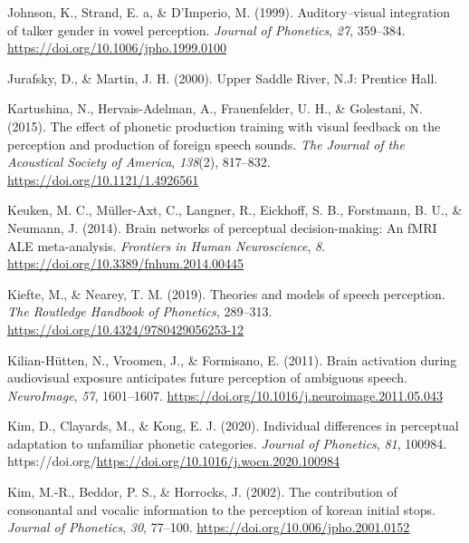 \documentclass[
  11pt,
  english,
  man,floatsintext]{apa6}
\newlength{\cslhangindent}
\newlength{\cslentryspacingunit} %
\newenvironment{CSLReferences}[2] %
 {%
  \setlength{\parindent}{0pt}
  \ifodd #1
  \let\oldpar\par
  \def\par{\hangindent=\cslhangindent\oldpar}
  \fi
  \setlength{\parskip}{#2\cslentryspacingunit}
 }%
 {}
\begin{document}
\begin{CSLReferences}{1}{0}
\leavevmode{}%
Johnson, K., Strand, E. a, \& D'Imperio, M. (1999). Auditory--visual integration of talker gender in vowel perception. \emph{Journal of Phonetics}, \emph{27}, 359--384. \url{https://doi.org/10.1006/jpho.1999.0100}

\leavevmode{}%
Jurafsky, D., \& Martin, J. H. (2000). Upper Saddle River, N.J: Prentice Hall.

\leavevmode{}%
Kartushina, N., Hervais-Adelman, A., Frauenfelder, U. H., \& Golestani, N. (2015). The effect of phonetic production training with visual feedback on the perception and production of foreign speech sounds. \emph{The Journal of the Acoustical Society of America}, \emph{138}(2), 817--832. \url{https://doi.org/10.1121/1.4926561}

\leavevmode{}%
Keuken, M. C., Müller-Axt, C., Langner, R., Eickhoff, S. B., Forstmann, B. U., \& Neumann, J. (2014). Brain networks of perceptual decision-making: An fMRI ALE meta-analysis. \emph{Frontiers in Human Neuroscience}, \emph{8}. \url{https://doi.org/10.3389/fnhum.2014.00445}

\leavevmode{}%
Kiefte, M., \& Nearey, T. M. (2019). Theories and models of speech perception. \emph{The Routledge Handbook of Phonetics}, 289--313. \url{https://doi.org/10.4324/9780429056253-12}

\leavevmode{}%
Kilian-Hütten, N., Vroomen, J., \& Formisano, E. (2011). Brain activation during audiovisual exposure anticipates future perception of ambiguous speech. \emph{NeuroImage}, \emph{57}, 1601--1607. \url{https://doi.org/10.1016/j.neuroimage.2011.05.043}

\leavevmode{}%
Kim, D., Clayards, M., \& Kong, E. J. (2020). Individual differences in perceptual adaptation to unfamiliar phonetic categories. \emph{Journal of Phonetics}, \emph{81}, 100984. https://doi.org/\url{https://doi.org/10.1016/j.wocn.2020.100984}

\leavevmode{}%
Kim, M.-R., Beddor, P. S., \& Horrocks, J. (2002). The contribution of consonantal and vocalic information to the perception of korean initial stops. \emph{Journal of Phonetics}, \emph{30}, 77--100. \url{https://doi.org/10.006/jpho.2001.0152}


\end{CSLReferences}
\end{document}
